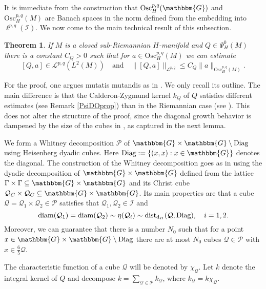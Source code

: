 \documentclass[10pt]{amsart}
\newtheorem{thm}{Theorem}[section]
\theoremstyle{remark}
\theoremstyle{definition}
\begin{document}
It is immediate from the construction that $\mathrm{Osc}^{p,q}_H(\mathbbm{G})$ and $\mathrm{Osc}^{p,q}_H(M)$ are Banach spaces in the norm defined from the embedding into $\ell^{p,q}(\mathcal{I})$. We now come to the main technical result of this subsection.

\begin{thm}
\label{oscestimate}
If $M$ is a closed sub-Riemannian $H$-manifold and $Q\in \Psi^0_H(M)$ there is a constant $C_Q>0$ such that for $a\in \mathrm{Osc}^{p,q}_H(M)$ we can estimate
$$[Q,a]\in \mathcal{L}^{p,q}(L^2(M))\quad\mbox{and}\quad \|[Q,a]\|_{\mathcal{L}^{p,q}}\leq C_Q \|a\|_{\mathrm{Osc}^{p,q}_H(M)}.$$
\end{thm}

For the proof, one argues mutatis mutandis as in \cite[Chapter II.A]{rochbergsemmes}. We only recall its outline. The main difference is that the Calderon-Zygmund kernel $k_Q$ of $Q$ satisfies different estimates (see Remark \ref{PsiDOprop}) than in the Riemannian case (see \cite[Equation (2.2)]{rochbergsemmes}). This does not alter the structure of the proof, since the diagonal growth behavior is dampened by the size of the cubes in \cite[Lemma 2.9]{rochbergsemmes}, as captured in the next lemma. 

We form a Whitney decomposition $\mathcal{P}$ of $\mathbbm{G}\times \mathbbm{G}\setminus \textnormal{Diag}$ using Heisenberg dyadic cubes. Here $\textnormal{Diag}:=\{(x,x): x\in \mathbbm{G}\}$ denotes the diagonal. The construction of the Whitney decomposition goes as in \cite[Chapter VI.1]{steindiff} using the dyadic decomposition of $\mathbbm{G}\times \mathbbm{G}$ defined from the lattice $\Gamma\times \Gamma\subseteq \mathbbm{G}\times \mathbbm{G}$ and its Christ cube $\mathcal{Q}_C\times \mathcal{Q}_C\subseteq  \mathbbm{G}\times \mathbbm{G}$. Its main properties are that a cube $\mathcal{Q}=\mathcal{Q}_1\times\mathcal{Q}_2\in \mathcal{P}$ satisfies that $\mathcal{Q}_1,\mathcal{Q}_2\in \mathcal{I}$ and 
$$\mathrm{diam}(\mathcal{Q}_1)= \mathrm{diam}(\mathcal{Q}_2)\sim \eta(\mathcal{Q}_i)\sim \mathrm{dist}_{{\mathrm{d}}_H}(\mathcal{Q},\textnormal{Diag}), \quad i=1,2.$$
Moreover, we can guarantee that there is a number $N_0$ such that for a point $x\in \mathbbm{G}\times \mathbbm{G}\setminus \textnormal{Diag}$ there are at most $N_0$ cubes $\mathcal{Q}\in \mathcal{P}$ with $x\in \frac{6}{5}\mathcal{Q}$. 

The characteristic function of a cube $\mathcal{Q}$ will be denoted by $\chi_\mathcal{Q}$. Let $k$ denote the integral kernel of $Q$ and decompose $k=\sum_{\mathcal{Q}\in \mathcal{P}} k_\mathcal{Q}$, where $k_\mathcal{Q}=k\chi_\mathcal{Q}$.
\end{document}
